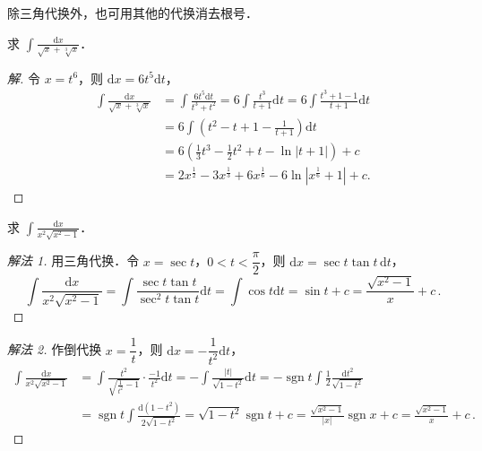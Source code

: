 除三角代换外，也可用其他的代换消去根号．

\begin{example}\label{ex:6-2-11}
求 $\displaystyle\int\frac{\mathrm{d}x}{\sqrt{x}+\sqrt[3]{x}}$．
\end{example}

\begin{proof}[解]
令 $x = t^{6}$，则 $\mathrm{d}x = 6t^{5}\mathrm{d}t$，
\[
\begin{aligned}
\int\frac{\mathrm{d}x}{\sqrt{x}+\sqrt[3]{x}}
&= \int\frac{6t^{5}\mathrm{d}t}{t^{3}+t^{2}}
= 6\int\frac{t^{3}}{t+1}\mathrm{d}t
= 6\int\frac{t^{3}+1-1}{t+1}\mathrm{d}t\\
&= 6\int\left(t^{2}-t+1-\frac{1}{t+1}\right)\mathrm{d}t\\
&= 6\left(\frac{1}{3}t^{3}-\frac{1}{2}t^{2}+t-\ln|t+1|\right)+c\\
&= 2x^{\frac{1}{2}}-3x^{\frac{1}{3}}+6x^{\frac{1}{6}}-6\ln\left|x^{\frac{1}{6}}+1\right|+c.
\end{aligned}
\]
\end{proof}

\begin{example}\label{ex:6-2-12}
求 $\displaystyle\int\frac{\mathrm{d}x}{x^{2}\sqrt{x^{2}-1}}$．
\end{example}

\begin{proof}[解法 1]
用三角代换．令 $x = \sec t$，$0 < t < \dfrac{\pi}{2}$，则 $\mathrm{d}x = \sec t\tan t\,\mathrm{d}t$，
\[
\int\frac{\mathrm{d}x}{x^{2}\sqrt{x^{2}-1}}
= \int\frac{\sec t\tan t}{\sec^{2}t\tan t}\mathrm{d}t
= \int\cos t\mathrm{d}t
= \sin t + c
= \frac{\sqrt{x^{2}-1}}{x}+c\,.
\]
\end{proof}

\begin{proof}[解法 2]
作倒代换 $x = \dfrac{1}{t}$，则 $\mathrm{d}x = -\dfrac{1}{t^{2}}\mathrm{d}t$，
\[
\begin{aligned}
\int\frac{\mathrm{d}x}{x^{2}\sqrt{x^{2}-1}}
&= \int\frac{t^{2}}{\sqrt{\frac{1}{t^{2}}-1}}\cdot\frac{-1}{t^{2}}\mathrm{d}t
= -\int\frac{|t|}{\sqrt{1-t^{2}}}\mathrm{d}t
= -\operatorname{sgn}t\int\frac{1}{2}\frac{\mathrm{d}t^{2}}{\sqrt{1-t^{2}}}\\
&= \operatorname{sgn}t\int\frac{\mathrm{d}(1-t^{2})}{2\sqrt{1-t^{2}}}
= \sqrt{1-t^{2}}\operatorname{sgn}t+c
= \frac{\sqrt{x^{2}-1}}{|x|}\operatorname{sgn}x+c
= \frac{\sqrt{x^{2}-1}}{x}+c\,.
\end{aligned}
\]
\end{proof}

